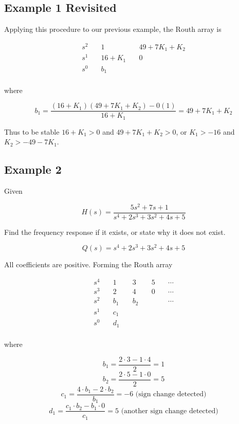 \documentclass{article}
\begin{document}
\subsection{Example 1 Revisited}

Applying this procedure to our previous example, the Routh array is

\begin{align*}
  s^2 &\quad 1 &\quad 49+7K_1 + K_2 \\
  s^1 &\quad 16+K_1 &\quad 0 \\
  s^0 &\quad b_1 &\quad \\
\end{align*}

where

\[
b_1 = \frac{(16+K_1)(49+7K_1 + K_2) - 0(1)}{16+K_1} = 49 + 7K_1 + K_2
\]

Thus to be stable $16+K_1 > 0$ and $49 + 7K_1 + K_2 > 0$, or $K_1 > -16$ and $K_2 > -49-7K_1$.

\subsection{Example 2}

Given

\[
H(s) = \frac{5s^2 + 7s + 1}{s^4 + 2s^3 + 3s^2 + 4s + 5}
\]

Find the frequency response if it exists, or state why it does not exist.

\[
Q(s) = s^4 + 2s^3 + 3s^2 + 4s + 5
\]

All coefficients are positive. Forming the Routh array

\begin{align*}
  s^4 &\quad 1 &\quad 3 &\quad 5 &\quad \cdots\\
  s^3 &\quad 2 &\quad 4 &\quad 0 &\quad \cdots\\
  s^2 &\quad b_1 &\quad b_2 &\quad &\quad \cdots\\
  s^1 &\quad c_1 &\quad  &\quad  &\quad \\
  s^0 &\quad d_1 &\quad  &\quad  &\quad \\
\end{align*}

where

\[
b_1 = \frac{2\cdot 3 - 1\cdot 4}{2} = 1
\]
\[
b_2 = \frac{2\cdot 5 - 1\cdot 0}{2} = 5
\]
\[
c_1 = \frac{4\cdot b_1 - 2\cdot b_2}{b_1} = -6 \text{ (sign change detected)}
\]
\[
d_1 = \frac{c_1\cdot b_2 - b_1\cdot 0}{c_1} = 5 \text{ (another sign change detected)}
\]
\end{document}
